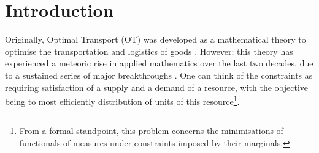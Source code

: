 \section{Introduction}



Originally, Optimal Transport (OT) was developed as a mathematical theory to optimise the transportation and logistics of goods \citep{monge1781memoire,kantorovich_translocation_2006}. However; this theory has experienced a meteoric rise in applied mathematics over the last two decades, due to a sustained series of major breakthroughs \citep{villani_topics_2003,villani_optimal_2009}.
One can think of the constraints  as requiring satisfaction of a supply and a demand of a resource, with the objective being to most efficiently distribution of units of this resource\footnote{From a formal standpoint, this problem concerns the minimisations of functionals of measures under constraints imposed by their marginals.}. 

